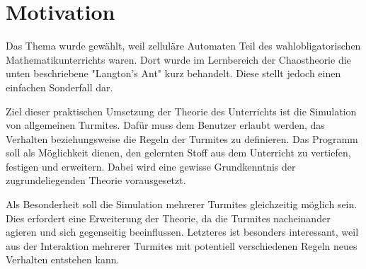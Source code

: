 \section{Motivation}
Das Thema wurde gewählt, weil zelluläre Automaten Teil des wahlobligatorischen Mathematikunterrichts waren. Dort wurde im Lernbereich der Chaostheorie die unten beschriebene "Langton's Ant" \cite{langtonsant} kurz behandelt. Diese stellt jedoch einen einfachen Sonderfall dar. 

Ziel dieser praktischen Umsetzung der Theorie des Unterrichts ist die Simulation von allgemeinen Turmites. Dafür muss dem Benutzer erlaubt werden, das Verhalten beziehungsweise die Regeln der Turmites zu definieren. Das Programm soll als Möglichkeit dienen, den gelernten Stoff aus dem Unterricht zu vertiefen, festigen und erweitern. Dabei wird eine gewisse Grundkenntnis der zugrundeliegenden Theorie vorausgesetzt.

Als Besonderheit soll die Simulation mehrerer Turmites gleichzeitig möglich sein. Dies erfordert eine Erweiterung der Theorie, da die Turmites nacheinander agieren und sich gegenseitig beeinflussen. Letzteres ist besonders interessant, weil aus der Interaktion mehrerer Turmites mit potentiell verschiedenen Regeln neues Verhalten entstehen kann.

